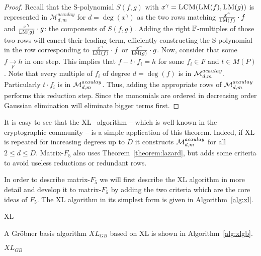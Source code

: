 \begin{proof}
Recall that the S-polynomial $S(f,g)$ with $x^\gamma = \textsc{LCM}(\textsc{LM}(f),\textsc{LM}(g))$ is represented in $\mathcal{M}^{acaulay}_{d,m}$ for $d = \deg(x^\gamma)$ as the two rows matching $\frac{x^\gamma}{\textsc{LM}(f)} \cdot f$ and $\frac{x^\gamma}{\textsc{LM}(g)} \cdot g$: the components of $S(f,g)$. Adding the right $\mathbb{F}$-multiples  of those two rows will cancel their leading term, efficiently constructing the S-polynomial in the row corresponding to $\frac{x^\gamma}{\textsc{LM}(f)} \cdot f$ or $\frac{x^\gamma}{\textsc{LM}(g)} \cdot g$. Now, consider that some $f \underset{F}{\rightarrow} h$ in one step. This
implies that $f - t \cdot f_i = h$ for some $f_i \in F$ and $t \in M(P)$. Note that every multiple of $f_i$ of degree $d = \deg(f)$ is in $\mathcal{M}^{acaulay}_{d,m}.$ Particularly $t \cdot f_i$ is in $\mathcal{M}^{acaulay}_{d,m}$. Thus, adding the appropriate rows of $\mathcal{M}^{acaulay}_{d,m}$ performs this reduction step. Since the monomials are ordered in decreasing order Gaussian elimination will eliminate bigger terms first.
\end{proof}

It is easy to see that the XL~\cite{courtois-klimov-patarin-shamir:eurocrypt2000} algorithm -- which is well known in the cryptographic community -- is a simple application of this theorem. Indeed, if XL is repeated for increasing degrees up to $D$ it constructs $\mathcal{M}^{acaulay}_{d,m}$ for all  $2 \leq d \leq D$. Matrix-$F_5$ also uses Theorem~\ref{theorem:lazard}, but adds some criteria to avoid useless reductions or redundant rows.

In order to describe matrix-$F_5$ we will first describe the XL algorithm in more detail and develop it to matrix-$F_5$ by adding the two criteria which are the core ideas of $F_5$. The XL algorithm in its simplest form is given in Algorithm~\ref{alg:xl}.
\begin{algorithm}[ht]
\caption{XL\label{alg:xl}}
\end{algorithm}

A Gröbner basis algorithm $XL_{GB}$ based on XL is shown in Algorithm~\ref{alg:xlgb}.

\begin{algorithm}[ht]
\caption{$XL_{GB}$}
\label{alg:xlgb} 
\end{algorithm}

